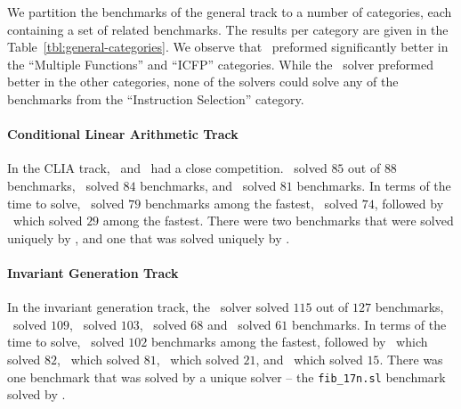 We partition the benchmarks of the general track to a number of categories, each containing a set of related benchmarks.
The results per category are given in the Table~\ref{tbl:general-categories}.
We observe that \eusolvernew\ preformed significantly better in the ``Multiple Functions'' and ``ICFP'' categories.
While the \cvcnew\ solver preformed better in the other categories,
none of the solvers could solve any of the benchmarks from the ``Instruction Selection'' category.



\paragraph{Conditional Linear Arithmetic Track}
In the CLIA track, \cvcnew\ and \dryd\ had a close competition.
\cvcnew\ solved $85$ out of $88$ benchmarks, \dryd\ solved $84$ benchmarks, and \eusolvernew\ solved $81$ benchmarks.
In terms of the time to solve, \dryd\ solved $79$ benchmarks among the fastest, \cvcnew\ solved $74$,
followed by \eusolvernew\ which solved $29$ among the fastest.
There were two benchmarks that were solved uniquely by \dryd,
and one that was solved uniquely by \cvcnew.

\paragraph{Invariant Generation Track}
In the invariant generation track, the \lig\ solver solved $115$ out of $127$ benchmarks, \cvcnew\ solved $109$,
\dryd\ solved $103$, \horndini\ solved $68$ and \eusolvernew\ solved $61$ benchmarks.
In terms of the time to solve, \lig\ solved $102$ benchmarks among the fastest, followed by \cvcnew\ which solved $82$,
\dryd\ which solved $81$, \horndini\ which solved $21$, and \eusolvernew\ which solved $15$.
There was one benchmark that was solved by a unique solver -- the \texttt{fib_17n.sl} benchmark solved by \lig. 

